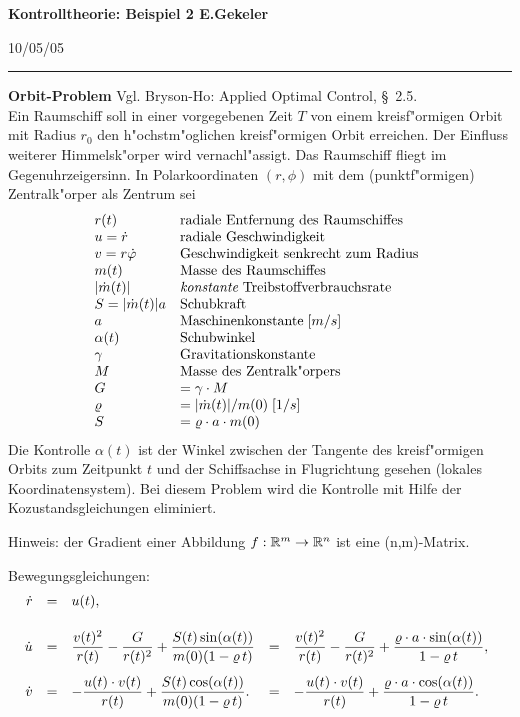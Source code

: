 \documentclass[12pt,a4paper,twoside,leqno]{article}
\newcommand{\Release}{10/05/05} %
\begin{document}
{\large\bf Kontrolltheorie: Beispiel 2 \hfill E.Gekeler}
\par
\vspace{-0.5ex}
\hfill{\footnotesize\Release\ }
\par\hrule\par\vspace{2ex}
{\bf Orbit-Problem}
Vgl. {\sc Bryson-Ho}: Applied Optimal Control, \S \, 2.5.\\
Ein Raumschiff soll in einer vorgegebenen Zeit $T$ von einem kreisf"ormigen
Orbit mit Radius $r_0$ den h"ochstm"oglichen kreisf"ormigen Orbit erreichen.  Der
Einfluss weiterer Himmelsk"orper wird vernachl"assigt.  Das Raumschiff fliegt im
Gegenuhrzeigersinn.  In Polarkoordinaten $(r,\phi )$ mit dem (punktf"ormigen)
Zentralk"orper als Zentrum sei
\[
\ba{.}{ll}
r(t)               & \mbox{radiale Entfernung des Raumschiffes}\\
u = \dot{r}        & \mbox{radiale Geschwindigkeit}\\
v = r\dot{\phi }   & \mbox{Geschwindigkeit senkrecht zum Radius}\\
m(t)               & \mbox{Masse des Raumschiffes}\\
|\dot{m}(t)|       & \mbox{{\em konstante} Treibstoffverbrauchsrate}\\
S = |\dot{m}(t)|a  & \mbox{Schubkraft}\\
a                  & \mbox{Maschinenkonstante}\; [m/s] \\
\alpha (t)         & \mbox{Schubwinkel}\\
\gamma             & \mbox{Gravitationskonstante}\\
M                  & \mbox{Masse des Zentralk"orpers}\\
G                  & = \gamma\cdot M\\
\rho               & = |\dot{m}(t)|/m(0) \; [1/s]\\
S                  & = \rho \cdot a \cdot m(0)
\ea{.}
\]
Die Kontrolle $\alpha (t)$  ist der Winkel zwischen der Tangente des
kreisf"ormigen Orbits zum Zeitpunkt $t$ und der Schiffsachse in Flugrichtung
gesehen (lokales Koordinatensystem). Bei diesem Problem wird die Kontrolle mit
Hilfe der Kozustandsgleichungen eliminiert.
\par
Hinweis: der Gradient einer Abbildung $f:\mb{R}^m \to \mb{R}^n$ ist eine
(n,m)-Matrix.
\par
Bewegungsgleichungen:
\[
\ba{.}{rclcl}
\dot{r} &=& u(t),\\[5mm]
\dot{u} &=& \dis \frac{v(t)^2}{r(t)} - \frac{G}{r(t)^2}
+ \frac{S(t)\sin (\alpha(t) )}{m(0)(1 - \rho \, t)}
&=&
\dis \frac{v(t)^2}{r(t)} - \frac{G}{r(t)^2}
+ \frac{\rho \cdot a \cdot \sin (\alpha(t) )}{1 - \rho \, t},\\[5mm]
\dot{v} &=& \dis - \frac{u(t)\cdot v(t)}{r(t)}
 + \frac{S(t)\cos (\alpha(t) )}{m(0)(1 - \rho \, t)}.
&=& \dis - \frac{u(t)\cdot v(t)}{r(t)}
 + \frac{\rho \cdot a \cdot \cos (\alpha(t) )}{1 - \rho \, t}.
\ea{.}
\]
\end{document}
